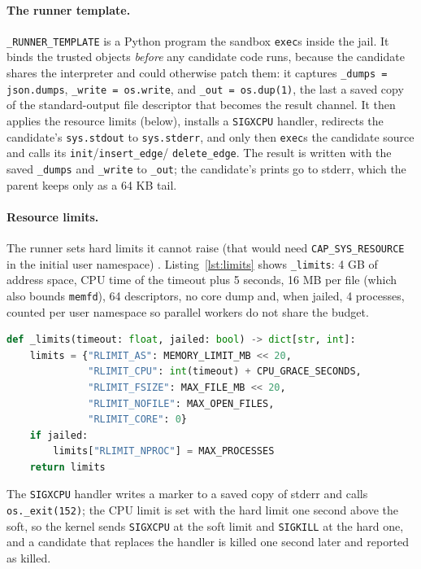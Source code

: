   \paragraph{The runner template.} \texttt{\_RUNNER\_TEMPLATE} is a Python
program the sandbox \texttt{exec}s inside the jail. It binds the trusted
objects \emph{before} any candidate code runs, because the candidate shares
the interpreter and could otherwise patch them: it captures
\texttt{\_dumps = json.dumps}, \texttt{\_write = os.write}, and
\texttt{\_out = os.dup(1)}, the last a saved copy of the standard-output file
descriptor that becomes the result channel. It then applies the resource
limits (below), installs a \texttt{SIGXCPU} handler, redirects the candidate's
\texttt{sys.stdout} to \texttt{sys.stderr}, and only then \texttt{exec}s the
candidate source and calls its \texttt{init}/\texttt{insert\_edge}/
\texttt{delete\_edge}. The result is written with the saved \texttt{\_dumps}
and \texttt{\_write} to \texttt{\_out}; the candidate's prints go to stderr,
which the parent keeps only as a 64 KB tail.

\paragraph{Resource limits.} The runner sets hard limits it cannot raise
(that would need \texttt{CAP\_SYS\_RESOURCE} in the initial user namespace)
\citep{tanenbaum2015modern}. Listing~\ref{lst:limits} shows \texttt{\_limits}:
4 GB of address space, CPU time of the timeout plus 5 seconds, 16 MB per file
(which also bounds \texttt{memfd}), 64 descriptors, no core dump and, when
jailed, 4 processes, counted per user namespace so parallel workers do not share
the budget.

\begin{lstlisting}[language=Python, basicstyle=\ttfamily\scriptsize,
  caption={The rlimits the runner applies to itself (\texttt{sandbox.py},
  \texttt{\_limits}).}, label={lst:limits}]
def _limits(timeout: float, jailed: bool) -> dict[str, int]:
    limits = {"RLIMIT_AS": MEMORY_LIMIT_MB << 20,
              "RLIMIT_CPU": int(timeout) + CPU_GRACE_SECONDS,
              "RLIMIT_FSIZE": MAX_FILE_MB << 20,
              "RLIMIT_NOFILE": MAX_OPEN_FILES,
              "RLIMIT_CORE": 0}
    if jailed:
        limits["RLIMIT_NPROC"] = MAX_PROCESSES
    return limits
\end{lstlisting}

The \texttt{SIGXCPU} handler writes a marker to a saved copy of stderr and
calls \texttt{os.\_exit(152)}; the CPU limit is set with the hard limit one
second above the soft, so the kernel sends \texttt{SIGXCPU} at the soft limit
and \texttt{SIGKILL} at the hard one, and a candidate that replaces the handler
is killed one second later and reported as killed.

